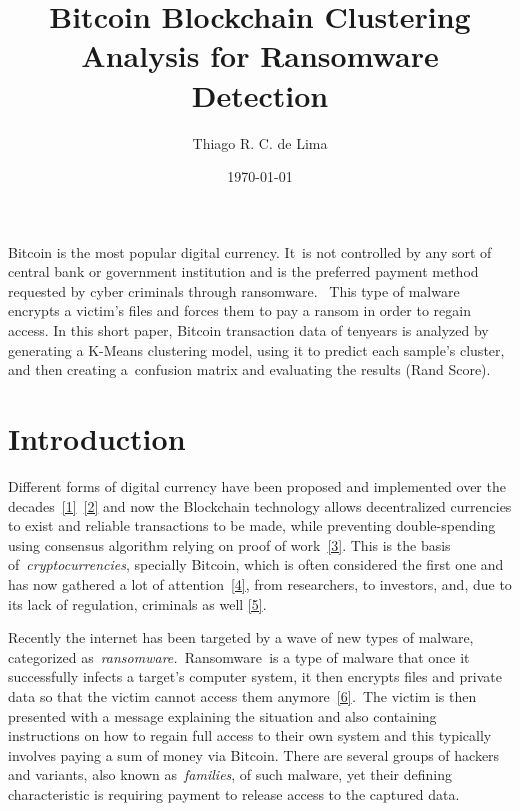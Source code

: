 \documentclass[10pt]{article}
\renewenvironment{abstract}
  {{\bfseries\noindent{\abstractname}\par\nobreak}\footnotesize}
  {\bigskip}
\begin{document}
\title{Bitcoin Blockchain Clustering Analysis for Ransomware Detection}



\author{Thiago R. C. de Lima}%


\vspace{-1em}



  \date{\today}


\begingroup
\let\center\flushleft
\let\endcenter\endflushleft
\maketitle
\endgroup





\begin{abstract}
Bitcoin is the most popular digital currency. It~is not controlled by
any sort of central bank or government institution and is the preferred
payment method requested by cyber criminals through ransomware.~ This
type of malware encrypts a victim's files and forces them to pay a
ransom in order to regain access. In this short paper, Bitcoin
transaction data of tenyears is analyzed by generating a K-Means
clustering model, using it to predict each sample's cluster, and then
creating a~confusion matrix and evaluating the results (Rand Score).%
\end{abstract}%



\sloppy


\section*{Introduction}

{\label{489411}}

Different forms of digital currency have been proposed and implemented
over the decades~\hyperref[csl:1]{[1]}~\hyperref[csl:2]{[2]} and now the
Blockchain technology allows decentralized currencies to exist and
reliable transactions to be made, while preventing double-spending using
consensus algorithm relying on proof of work~\hyperref[csl:3]{[3]}. This is
the basis of~\emph{cryptocurrencies}, specially Bitcoin, which is often
considered the first one and has now gathered a lot of
attention~\hyperref[csl:4]{[4]}, from researchers, to investors, and, due
to its lack of regulation, criminals as well \hyperref[csl:5]{[5]}.~

Recently the internet has been targeted by a wave of new types of
malware, categorized as~\emph{ransomware.~}Ransomware\emph{~}is a type
of malware that once it successfully infects a target's computer system,
it then encrypts files and private data so that the victim cannot access
them anymore~\hyperref[csl:6]{[6]}\emph{.}~The victim is then presented
with a message explaining the situation and also containing instructions
on how to regain full access to their own system and this typically
involves paying a sum of money via Bitcoin. There are several groups of
hackers and variants, also known as~\emph{families}, of such malware,
yet their defining characteristic is requiring payment to release access
to the captured data.
\end{document}

